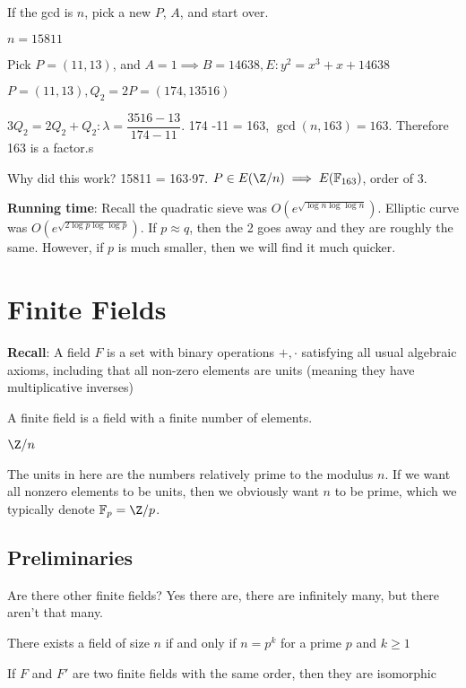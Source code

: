 \documentclass[10pt]{article}
\newcommand{\F}{\mathbb{F}}
\begin{document}
\begin{rmk}
    If the gcd is $n$, pick a new $P$, $A$, and start over.
\end{rmk}

\begin{exm*}
    $n = 15811$
\end{exm*}
Pick $P = (11, 13)$, and $A =1 \implies B = 14638, E: y^2 = x^3 + x + 14638$

$P = (11, 13), Q_2 = 2P = (174, 13516)$

$3Q_2 = 2Q_2 + Q_2: \lambda = \dfrac{3516 - 13}{174 -11}$. 174 -11 = 163, $\gcd(n, 163) = 163$. Therefore 163 is a factor.s

Why did this work? 15811 = 163$\cdot$97. $P \in E(\Z/n) \implies E(\F_{163})$, order of 3.

\textbf{Running time}: Recall the quadratic sieve was $O(e^{\sqrt{\log n \log\log n}})$. Elliptic curve was $O(e^{\sqrt{2\log p \log\log p}})$. If $p \approx q$, then the 2 goes away and they are roughly the same. However, if $p$ is much smaller, then we will find it much quicker.

\section{Finite Fields}
\textbf{Recall}: A field $F$ is a set with binary operations $+, \cdot$ satisfying all usual algebraic axioms, including that all non-zero elements are units (meaning they have multiplicative inverses)

A finite field is a field with a finite number of elements. 

\begin{exm*}
    $\Z/n$
\end{exm*}
The units in here are the numbers relatively prime to the modulus $n$. If we want all nonzero elements to be units, then we obviously want $n$ to be prime, which we typically denote $\F_p = \Z/p$. 

\subsection{Preliminaries} Are there other finite fields? Yes there are, there are infinitely many, but there aren't that many.

\begin{thm}
    There exists a field of size $n$ if and only if $n = p^k$ for a prime $p$ and $k \geq 1$
\end{thm}
\begin{thm}
    If $F$ and $F'$ are two finite fields with the same order, then they are isomorphic
\end{thm}
\end{document}
